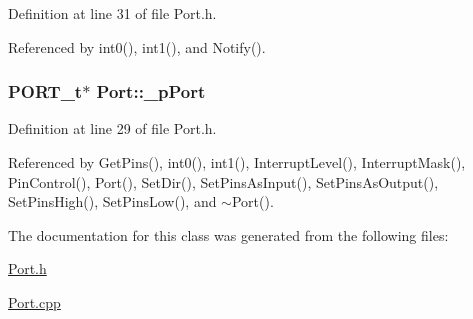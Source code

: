 Definition at line 31 of file Port.h.



Referenced by int0(), int1(), and Notify().

\hypertarget{class_port_a1475caa8ec2e667350eae96d4b7a28ac}{
\subsubsection[{\_\-pPort}]{\setlength{\rightskip}{0pt plus 5cm}PORT\_\-t$\ast$ {\bf Port::\_\-pPort}}}
\label{class_port_a1475caa8ec2e667350eae96d4b7a28ac}


Definition at line 29 of file Port.h.



Referenced by GetPins(), int0(), int1(), InterruptLevel(), InterruptMask(), PinControl(), Port(), SetDir(), SetPinsAsInput(), SetPinsAsOutput(), SetPinsHigh(), SetPinsLow(), and $\sim$Port().



The documentation for this class was generated from the following files:\begin{DoxyCompactItemize}
\item 
\hyperlink{_port_8h}{Port.h}\item 
\hyperlink{_port_8cpp}{Port.cpp}\end{DoxyCompactItemize}
